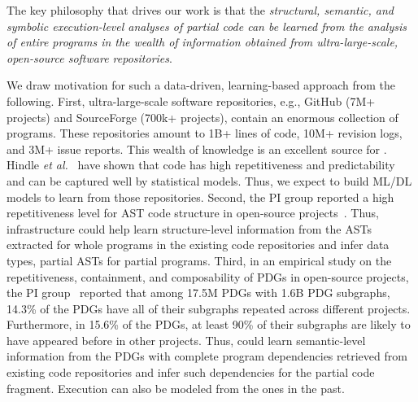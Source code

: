 \begin{center}
    \begin{minipage}{36em}
The key philosophy that drives our work is that the {\em structural, semantic, and symbolic execution-level analyses of partial code can be learned from the analysis of entire programs in the wealth of information obtained from ultra-large-scale, open-source software repositories}.
    \end{minipage}
\end{center}



We draw motivation for such a data-driven, learning-based approach from the following. First, ultra-large-scale software repositories, e.g., GitHub (7M+ projects) and SourceForge (700k+ projects), contain an enormous collection of programs. These repositories amount to 1B+ lines of code, 10M+ revision logs, and 3M+ issue reports. This wealth of knowledge is an excellent source for {\tool}. Hindle {\em et al.}~\cite{naturalness-icse12} have shown that code has high repetitiveness and predictability and can be captured well by statistical models. Thus, we expect to build ML/DL models to learn from those repositories. 
Second, the PI group reported a high repetitiveness level for AST code structure in open-source projects~\cite{icse15}. Thus, {\tool} infrastructure could help learn structure-level information from the ASTs extracted for whole programs in the existing code repositories and infer data types, partial ASTs for partial programs. Third, in an empirical study on the repetitiveness, containment, and composability of PDGs in open-source projects, the PI group~\cite{msr16} reported that among 17.5M PDGs with 1.6B PDG subgraphs, 14.3\% of the PDGs have all of their subgraphs repeated across different projects. Furthermore, in 15.6\% of the PDGs, at least 90\% of their subgraphs are likely to have appeared before in other projects. 
Thus, {\tool} could learn semantic-level information from the PDGs with complete program dependencies retrieved from existing code repositories and infer such dependencies for the partial code fragment. Execution can also be modeled
from the ones in the past.


